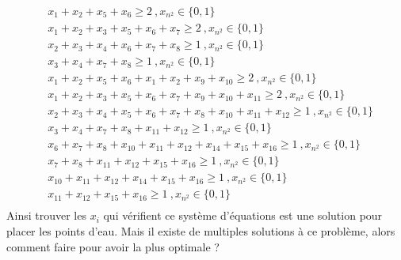 \documentclass[french,a4paper]{article}
\begin{document}
\begin{equation}
    \begin{aligned}
         & x_1+x_2+x_5+x_6 \ge 2 \ , x_{n^2} \in \{0,1\}                                       \\
         & x_1+x_2+x_3+x_5+x_6+x_7 \ge 2 \ , x_{n^2} \in \{0,1\}                               \\
         & x_2+x_3+x_4+x_6+x_7+x_8 \ge 1 \ , x_{n^2} \in \{0,1\}                               \\
         & x_3+x_4+x_7+x_8 \ge 1 \ , x_{n^2} \in \{0,1\}                                       \\
         & x_1+x_2+x_5+x_6+x_1+x_2+x_9+x_{10} \ge 2 \ , x_{n^2} \in \{0,1\}                    \\
         & x_1+x_2+x_3+x_5+x_6+x_7+x_9+x_{10}+x_{11} \ge 2 \ , x_{n^2} \in \{0,1\}             \\
         & x_2+x_3+x_4+x_5+x_6+x_7+x_8+x_{10}+x_{11}+x_{12} \ge 1 \ , x_{n^2} \in \{0,1\}      \\
         & x_3+x_4+x_7+x_8+x_{11}+x_{12} \ge 1 \ , x_{n^2} \in \{0,1\}                         \\
         & x_6+x_7+x_8+x_{10}+x_{11}+x_{12}+x_{14}+x_{15}+x_{16} \ge 1 \ , x_{n^2} \in \{0,1\} \\
         & x_7+x_8+x_{11}+x_{12}+x_{15}+x_{16} \ge 1 \ , x_{n^2} \in \{0,1\}                   \\
         & x_{10}+x_{11}+x_{12}+x_{14}+x_{15}+x_{16} \ge 1 \ , x_{n^2} \in \{0,1\}             \\
         & x_{11}+x_{12}+x_{15}+x_{16} \ge 1 \ , x_{n^2} \in \{0,1\}                           \\
    \end{aligned}
\end{equation}
\newline
Ainsi trouver les $x_i$ qui vérifient ce système d'équations est une solution pour placer les points d'eau.
Mais il existe de multiples solutions à ce problème, alors comment faire pour avoir la plus optimale ?
\end{document}
